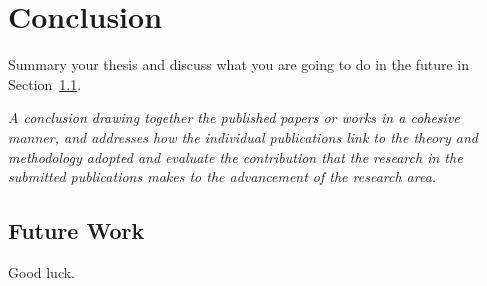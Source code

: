 \chapter{Conclusion}
\label{cha:conc}
Summary your thesis and discuss what you are going to do in the future in Section~\ref{sec:future}.

\emph{A conclusion drawing together the published papers or works in a cohesive manner, and addresses how the individual publications link to the theory and methodology adopted and evaluate the contribution that the research in the submitted publications makes to the advancement of the research area.}

\section{Future Work}
\label{sec:future}
Good luck.



